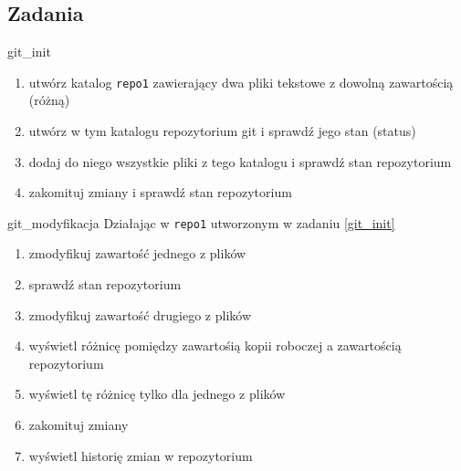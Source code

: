 \documentclass{pdfBooklets}
\begin{document}

\subsection{Zadania}

\begin{Zadanie}{}{git_init}
\begin{enumerate}
\item utwórz katalog \Verb#repo1# zawierający dwa pliki tekstowe z dowolną zawartością (różną)
\item utwórz w tym katalogu repozytorium git i sprawdź jego stan (status)
\item dodaj do niego wszystkie pliki z tego katalogu i sprawdź stan repozytorium
\item zakomituj zmiany i sprawdź stan repozytorium
\end{enumerate}
\end{Zadanie}

\begin{Zadanie}{}{git_modyfikacja}
Działając w \Verb#repo1# utworzonym w zadaniu \ref{git_init}
\begin{enumerate}
\item zmodyfikuj zawartość jednego z plików
\item sprawdź stan repozytorium
\item zmodyfikuj zawartość drugiego z plików
\item wyświetl różnicę pomiędzy zawartośią kopii roboczej a zawartością repozytorium
\item wyświetl tę różnicę tylko dla jednego z plików
\item zakomituj zmiany
\item wyświetl historię zmian w repozytorium
\end{enumerate}
\end{Zadanie}
\end{document}
